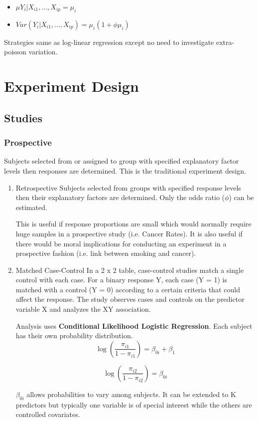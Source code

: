 \documentclass[11pt]{article}
\begin{document}
\begin{itemize}
\item \(\mu{Y_i | X_{i1}, ..., X_{ip}} = \mu_i\)
\item \(Var(Y_i | X_{i1}, ..., X_{ip}) = \mu_i(1 + \phi\mu_i)\)
\end{itemize}

Strategies same as log-linear regression except no need to investigate
extra-poisson variation.

\section{Experiment Design}
\label{sec:org2994bf4}
\subsection{Studies}
\label{sec:org84ac288}
\subsubsection{Prospective}
\label{sec:org84988f0}
Subjects selected from or assigned to group with specified explanatory
factor levels then responses are determined. This is the traditional
experiment design.

\begin{enumerate}
\item Retrospective
\label{sec:org388c465}
Subjects selected from groups with specified response levels then their
explanatory factors are determined. Only the odds ratio (\(\phi\)) can be
estimated.

This is useful if response proportions are small which would normally
require huge samples in a prospective study (i.e. Cancer Rates). It is
also useful if there would be moral implications for conducting an
experiment in a prospective fashion (i.e. link between smoking and
cancer).

\item Matched Case-Control
\label{sec:org5d18f7e}
In a 2 x 2 table, case-control studies match a single control with each
case. For a binary response Y, each case (Y = 1) is matched with a
control (Y = 0) according to a certain criteria that could affect the
response. The study observes cases and controls on the predictor
variable X and analyzes the XY association.

Analysis uses \textbf{Conditional Likelihood Logistic Regression}. Each subject
has their own probability distribution. $$
    \log(\frac{\pi_{i1}}{1 - \pi_{i1}}) = \beta_{0i} + \beta_1
$$

$$
    \log(\frac{\pi_{i2}}{1 - \pi_{i2}}) = \beta_{0i}
$$

\(\beta_{0i}\) allows probabilities to vary among subjects. It can be
extended to K predictors but typically one variable is of special
interest while the others are controlled covariates.
\end{enumerate}
\end{document}
